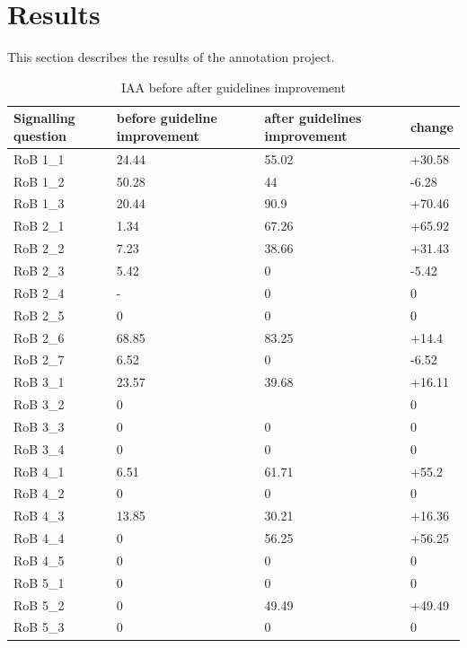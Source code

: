 \documentclass[sn-mathphys,Numbered]{sn-jnl}%
\theoremstyle{thmstyleone}%
\theoremstyle{thmstyletwo}%
\theoremstyle{thmstylethree}%
\begin{document}
\section{Results}
\label{sec:results}
%
This section describes the results of the annotation project.

%
%
%
\begin{table}[!ht]
    \caption{IAA before after guidelines improvement}
    \label{table:IAA_sq}
    \centering
    \begin{tabular}{llll}
    \hline
        Signalling question & before guideline improvement & after guidelines improvement & change \\
    \hline
        RoB 1\_1 & 24.44 & 55.02 & +30.58 \\ 
        RoB 1\_2 & 50.28 & 44 & -6.28 \\ 
        RoB 1\_3 & 20.44 & 90.9 & +70.46 \\ 
        RoB 2\_1 & 1.34 & 67.26 & +65.92 \\ 
        RoB 2\_2 & 7.23 & 38.66 & +31.43 \\ 
        RoB 2\_3 & 5.42 & 0 & -5.42 \\ 
        RoB 2\_4 & - & 0 & 0 \\ 
        RoB 2\_5 & 0 & 0 & 0 \\ 
        RoB 2\_6 & 68.85 & 83.25 & +14.4 \\ 
        RoB 2\_7 & 6.52 & 0 & -6.52 \\ 
        RoB 3\_1 & 23.57 & 39.68 & +16.11 \\ 
        RoB 3\_2 & 0 & ~ & 0 \\ 
        RoB 3\_3 & 0 & 0 & 0 \\ 
        RoB 3\_4 & 0 & 0 & 0 \\ 
        RoB 4\_1 & 6.51 & 61.71 & +55.2 \\ 
        RoB 4\_2 & 0 & 0 & 0 \\ 
        RoB 4\_3 & 13.85 & 30.21 & +16.36 \\ 
        RoB 4\_4 & 0 & 56.25 & +56.25 \\ 
        RoB 4\_5 & 0 & 0 & 0 \\ 
        RoB 5\_1 & 0 & 0 & 0 \\ 
        RoB 5\_2 & 0 & 49.49 & +49.49 \\ 
        RoB 5\_3 & 0 & 0 & 0 \\ \hline
    \end{tabular}
\end{table}
%
%
%
\end{document}
